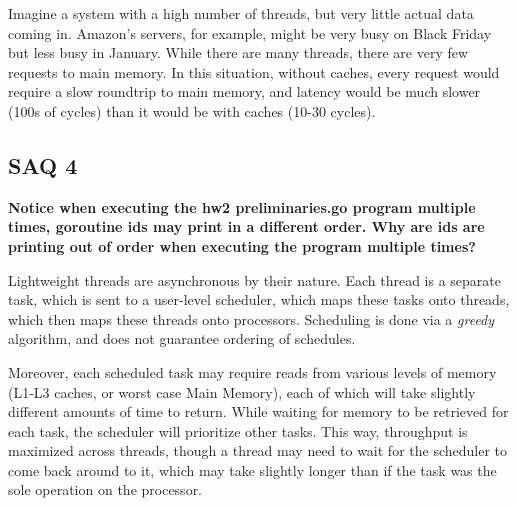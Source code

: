 \documentclass[12pt]{article}
\begin{document}
Imagine a system with a high number of threads, but very little actual data coming in. Amazon's servers, for example, might be very busy on Black Friday but less busy in January. While there are many threads, there are very few requests to main memory. In this situation, without caches, every request would require a slow roundtrip to main memory, and latency would be much slower (100s of cycles) than it would be with caches (10-30 cycles).  


\subsection*{SAQ 4}
\textbf{Notice when executing the hw2 preliminaries.go program multiple times, goroutine ids may print in a different order. Why are ids are printing out of order when executing the program multiple times?}

\vspace{5mm}

Lightweight threads are asynchronous by their nature. Each thread is a separate task, which is sent to a user-level scheduler, which maps these tasks onto threads, which then maps these threads onto processors. Scheduling is done via a \textit{greedy} algorithm, and does not guarantee ordering of schedules. 

Moreover, each scheduled task may require reads from various levels of memory (L1-L3 caches, or worst case Main Memory), each of which will take slightly different amounts of time to return. While waiting for memory to be retrieved for each task, the scheduler will prioritize other tasks. This way, throughput is maximized across threads, though a thread may need to wait for the scheduler to come back around to it, which may take slightly longer than if the task was the sole operation on the processor.
\end{document}
